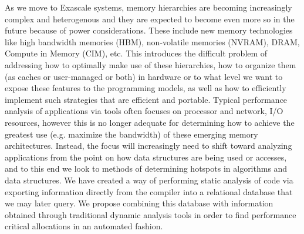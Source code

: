 As we move to Exascale systems, memory hierarchies are becoming increasingly complex and heterogenous and they are expected to become even more so in 
the future because of power considerations. These include new memory technologies like high bandwidth memories (HBM), non-volatile memories (NVRAM), 
DRAM, Compute in Memory (CIM), etc.
This introduces the difficult problem of addressing how to optimally make use of these hierarchies, how to organize them (as caches or user-managed or both) in 
hardware or to what level we want to expose these features to the programming models, as well as how to efficiently  implement such strategies that are efficient 
and portable.
Typical performance analysis of applications via tools often focuses on processor and network, I/O resources, however this is no longer adequate for determining 
how to achieve the greatest use (e.g. maximize the bandwidth) of these emerging memory architectures. Instead, the focus will increasingly need to shift toward 
analyzing applications from the point on how data structures are being used or accesses, and to this end we look to methods of determining 
hotspots in algorithms and data structures. 
We have created a way of performing static analysis of code via exporting information directly from the compiler into a relational 
database that we may later query. We propose combining this database with information obtained through traditional dynamic analysis tools in order to find 
performance critical allocations in an automated fashion.